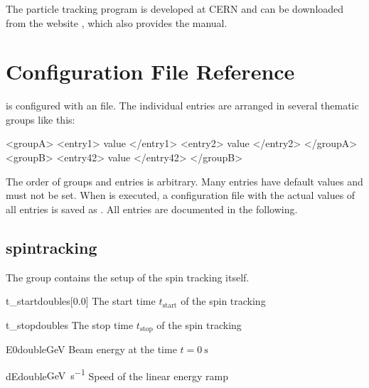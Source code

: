 \documentclass[a4paper]{scrartcl}
\begin{document}
\subsubsection{\madx}
\label{sec:madx}
The particle tracking program \madx is developed at CERN and can be downloaded from the
website \cite{madx}, which also provides the \madx manual.






\section{Configuration File Reference}
\label{sec:config}

\polem is configured with an \xml file. The individual entries are arranged in several
thematic groups like this:
\begin{xmlcode}
  <groupA>
    <entry1> value </entry1>
    <entry2> value </entry2>
  </groupA>
  <groupB>
    <entry42> value </entry42>
  </groupB>
\end{xmlcode}
The order of groups and entries is arbitrary. Many entries have default values and must
not be set. When \polem is executed, a configuration file with the actual values of all
entries is saved as . All entries are
documented in the following.

\subsection{spintracking}
\label{sec:config-spintrk}

The group  contains the setup of the spin tracking itself.\\[2mm]

\begin{configdoc}{t_start}{double}{\si{\s}}[0.0]
  The start time $t_\text{start}$ of the spin tracking
\end{configdoc}

\begin{configdoc}{t_stop}{double}{\si{\s}}
  The stop time $t_\text{stop}$ of the spin tracking
\end{configdoc}

\begin{configdoc}{E0}{double}{\si{\GeV}}
  Beam energy at the time $t=\SI{0}{\s}$
\end{configdoc}

\begin{configdoc}{dE}{double}{\si{\GeV\per\s}}
  Speed of the linear energy ramp
\end{configdoc}
\end{document}
